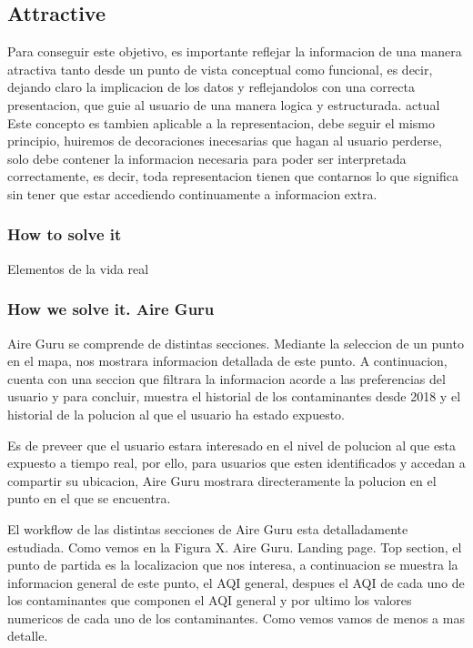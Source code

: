 \subsection{Attractive}
Para conseguir este objetivo, es importante reflejar la informacion de una manera atractiva tanto desde un punto de vista conceptual como funcional, 
es decir, dejando claro la implicacion de los datos y reflejandolos con una correcta presentacion, que guie al usuario de una manera logica y estructurada.
actual
Este concepto es tambien aplicable a la representacion, debe seguir el mismo principio, huiremos de decoraciones inecesarias que hagan al 
usuario perderse, solo debe contener la informacion necesaria para poder ser interpretada correctamente, es decir,
toda representacion tienen que contarnos lo que significa sin tener que estar accediendo continuamente a informacion
extra.

\subsubsection{How to solve it} 
Elementos de la vida real

\subsubsection{How we solve it. Aire Guru} 
Aire Guru se comprende de distintas secciones. Mediante la seleccion de un punto en el mapa, nos
mostrara informacion detallada de este punto. A continuacion, cuenta con una seccion que filtrara la informacion acorde a las preferencias del usuario
y para concluir, muestra el historial de los contaminantes desde 2018 y el historial de la polucion al que el usuario ha estado
expuesto.

Es de preveer que el usuario estara interesado en el nivel de polucion al que esta expuesto a tiempo real, por ello, para usuarios
que esten identificados y accedan a compartir su ubicacion, Aire Guru mostrara directeramente la polucion en el punto en el 
que se encuentra.

El workflow de las distintas secciones de Aire Guru esta detalladamente estudiada. Como vemos en la Figura X. Aire Guru. Landing page. Top section, el punto de partida es la localizacion que nos interesa,
a continuacion se muestra la informacion general de este punto, el AQI general, despues el AQI de cada uno de los contaminantes que componen el 
AQI general y por ultimo los valores numericos de cada uno de los contaminantes. Como vemos vamos de menos a mas detalle.
\begin{itemize}
    \done
    \crossed
    
\end{itemize}
\newpage